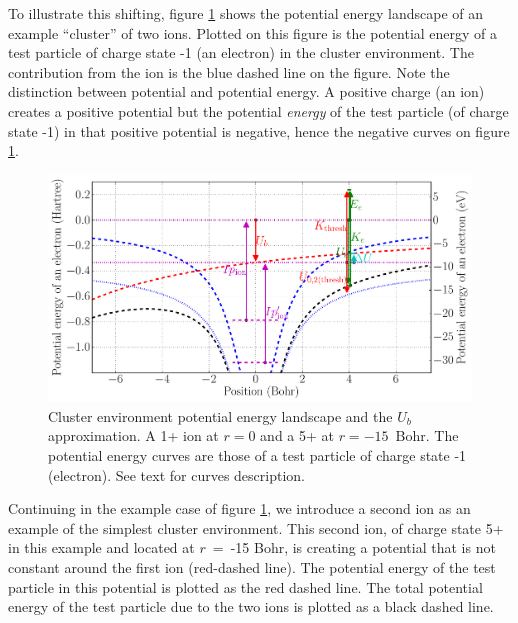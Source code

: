 To illustrate this shifting, figure \ref{fig:md:Vb} shows the potential energy
landscape of an example ``cluster'' of two ions. Plotted on this figure is the
potential energy of a test particle of charge state -1 (an electron) in the
cluster environment. The contribution from the ion is the blue dashed line on the
figure. Note the distinction between potential and potential
energy. A positive charge (an ion) creates a positive potential but the
potential \textit{energy} of the test particle (of charge state -1) in that
positive potential is negative, hence the negative curves on figure
\ref{fig:md:Vb}.



\begin{figure}
    \begin{center}
    \includegraphics[width=\figurewidth]{figures/potential_landscape}
    \end{center}
    \caption{\label{fig:md:Vb}Cluster environment potential energy landscape
             and the $U_b$ approximation. A 1+ ion at $r=0$ and a 5+ at
             $r=-15$~Bohr. The potential energy curves are those of a test
             particle of charge state -1 (electron). See text for curves
             description.}
\end{figure}


Continuing in the example case of figure \ref{fig:md:Vb}, we introduce a
second ion
as an example of the simplest
cluster environment. This second ion, of
charge state 5+ in this example and located at $r$~=~-15 Bohr, is creating a
potential that is not constant around the first ion (red-dashed line). The potential energy of
the test particle in this potential is plotted as the red dashed line. The total
potential energy of the test particle due to the two ions is plotted as a black
dashed line.

